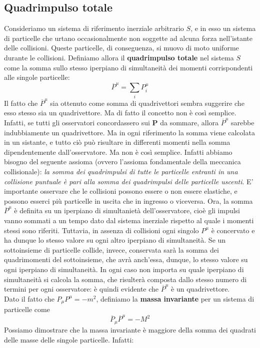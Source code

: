 \documentclass[a4paper,11pt]{book}
\theoremstyle{plain}
\theoremstyle{definition}
\begin{document}
\subsection{Quadrimpulso totale}
Consideriamo un sistema di riferimento inerziale arbitrario $S$, e in esso un sistema di particelle che urtano occasionalmente non soggette ad alcuna forza nell'istante delle collisioni. Queste particelle, di conseguenza, si muovo di moto uniforme durante le collisioni. Definiamo allora il \textbf{quadrimpulso totale} nel sistema $S$ come la somma sullo stesso iperpiano di simultaneità dei momenti corrispondenti alle singole particelle:
\[
\overline{P}^{\mu} = \sum_{i}P^{\mu}_i
\]
Il fatto che $\overline{P}^{\mu}$ sia ottenuto come somma di quadrivettori sembra suggerire che esso stesso sia un quadrivettore. Ma di fatto il concetto non è così semplice. Infatti, se tutti gli osservatori concordassero sui $\textbf{P}$ da sommare, allora $\overline{P}^{\mu}$ sarebbe indubbiamente un quadrivettore. Ma in ogni riferimento la somma viene calcolata in un sistante, e tutto ciò può risultare in differenti momenti nella somma dipendentemente dall'osservatore. Ma non è così semplice. Infatti abbiamo bisogno del seguente assioma (ovvero l'assioma fondamentale della meccanica collisionale): \emph{la somma dei quadrimpulsi di tutte le particelle entranti in una collisione puntuale è pari alla somma dei quadrimpulsi delle particelle uscenti}. E' importante osservare che le collisioni possono essere o non essere elastiche, e possono esserci più particelle in uscita che in ingresso o viceversa. Ora, la somma $\overline{P}^{\mu}$ è definita su un iperpiano di simultanietà dell'osservatore, cioè gli impulsi vanno sommati a un tempo dato dal sistema inerziale rispetto al quale i momenti stessi sono riferiti. Tuttavia, in assenza di collisioni ogni singolo $P^{\mu}$ è concervato e ha dunque lo stesso valore su ogni altro iperpiano di simultaneità. Se un sottoinsieme di particelle collide, invece, conservata sarà la somma dei quadrimomenti del sottoinsieme, che avrà anch'essa, dunque, lo stesso valore su ogni iperpiano di simultaneità. In ogni caso non importa su quale iperpiano di simultaneità si calcola la somma, che risulterà composta dallo stesso numero di termini per ogni osservatore: è quindi evidente che $\overline{P}^{\mu}$ è un quadrivettore. 
\\
Dato il fatto che $P_{\mu}P^{\mu}=-m^2$, definiamo la \textbf{massa invariante} per un sistema di particelle come
\[
\overline{P}_{\mu}\overline{P}^{\mu}=-M^2
\]
Possiamo dimostrare che la massa invariante è maggiore della somma dei quadrati delle masse delle singole particelle. Infatti:
\end{document}
